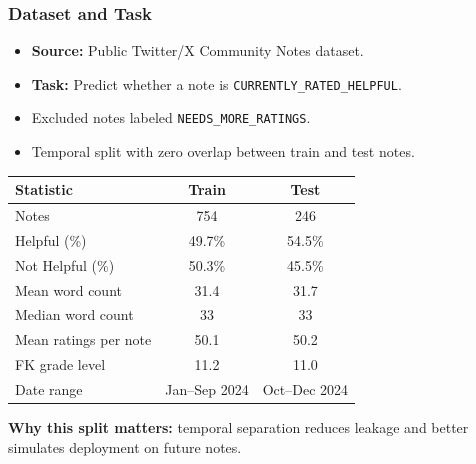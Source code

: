 \documentclass[11pt]{beamer}
\begin{document}
	\begin{frame}
		\frametitle{Dataset and Task}
		\begin{itemize}
			\item \textbf{Source:} Public Twitter/X Community Notes dataset.
			\item \textbf{Task:} Predict whether a note is \texttt{CURRENTLY\_RATED\_HELPFUL}.
			\item Excluded notes labeled \texttt{NEEDS\_MORE\_RATINGS}.
			\item Temporal split with zero overlap between train and test notes.
		\end{itemize}
		
		\vspace{0.2cm}
		\begin{table}
			\centering
			\small
			\begin{tabular}{lcc}
				\toprule
				\textbf{Statistic} & \textbf{Train} & \textbf{Test} \\
				\midrule
				Notes & 754 & 246 \\
				Helpful (\%) & 49.7\% & 54.5\% \\
				Not Helpful (\%) & 50.3\% & 45.5\% \\
				Mean word count & 31.4 & 31.7 \\
				Median word count & 33 & 33 \\
				Mean ratings per note & 50.1 & 50.2 \\
				FK grade level & 11.2 & 11.0 \\
				Date range & Jan--Sep 2024 & Oct--Dec 2024 \\
				\bottomrule
			\end{tabular}
		\end{table}
		
		\vspace{0.1cm}
		\textbf{Why this split matters:} temporal separation reduces leakage and better simulates deployment on future notes.
	\end{frame}
	
\end{document}

